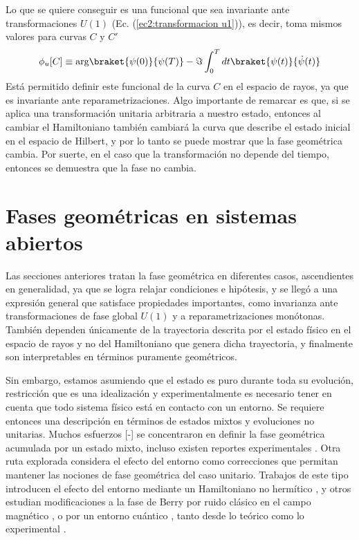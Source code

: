 Lo que se quiere conseguir es una funcional que sea invariante ante transformaciones $U(1)$ (Ec. (\ref{ec2:transformacion u1})), es decir, toma mismos valores para curvas $C$ y $C'$
\begin{equation} \label{ec2:fg cinematica unitaria}
    \phi_u[C] \equiv \text{arg} \braket{\psi(0)}{\psi(T)} - \Im \int_0^T dt \braket{\psi(t)}{\dot \psi(t)}
\end{equation}
Está permitido definir este funcional de la curva $C$ en el espacio de rayos, ya que es invariante ante reparametrizaciones. Algo importante de remarcar es que, si se aplica una transformación unitaria arbitraria a nuestro estado, entonces al cambiar el Hamiltoniano también cambiará la curva que describe el estado inicial en el espacio de Hilbert, y por lo tanto se puede mostrar que la fase geométrica cambia. Por suerte, en el caso que la transformación no depende del tiempo, entonces se demuestra que la fase no cambia. 

\section{Fases geométricas en sistemas abiertos}\label{sec2:sistemas abiertos}
Las secciones anteriores tratan la fase geométrica en diferentes casos, ascendientes en generalidad, ya que se logra relajar condiciones e hipótesis, y se llegó a una expresión general que satisface propiedades importantes, como invarianza ante transformaciones de fase global $U(1)$ y a reparametrizaciones monótonas. También dependen únicamente de la trayectoria descrita por el estado físico en el espacio de rayos y no del Hamiltoniano que genera dicha trayectoria, y finalmente son interpretables en términos puramente geométricos. 

Sin embargo, estamos asumiendo que el estado es puro durante toda su evolución, restricción que es una idealización y experimentalmente es necesario tener en cuenta que todo sistema físico está en contacto con un entorno. Se requiere entonces una descripción en términos de estados mixtos y evoluciones no unitarias. Muchos esfuerzos [\cite{Uhlmann1}-\cite{Singh2003}] se concentraron en definir la fase geométrica acumulada por un estado mixto, incluso existen reportes experimentales \cite{Du2003}. Otra ruta explorada considera el efecto del entorno como correcciones que permitan mantener las nociones de fase geométrica del caso unitario. Trabajos de este tipo introducen el efecto del entorno mediante un Hamiltoniano no hermítico \cite{Carollo2003,Carollo2005}, y otros estudian modificaciones a la fase de Berry por ruido clásico en el campo magnético \cite{DeChiara2003}, o por un entorno cuántico \cite{Whitney2003,Whitney2005}, tanto desde lo teórico como lo experimental \cite{Berger2013,Berger2015}.

